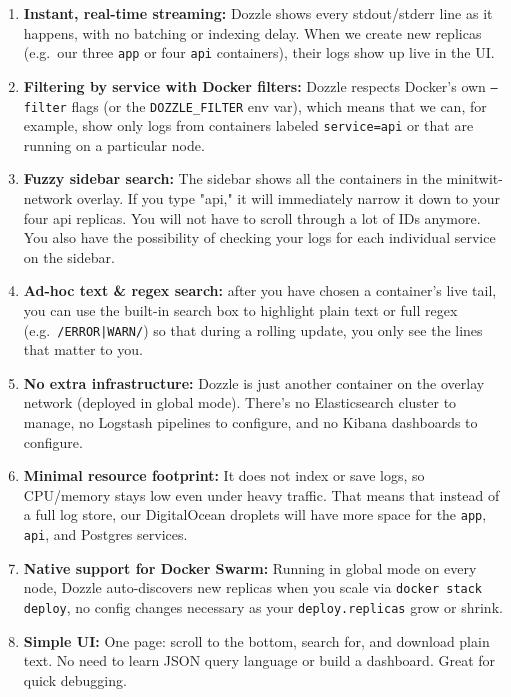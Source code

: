 \begin{enumerate}

  \item \textbf{Instant, real-time streaming:} Dozzle shows every stdout/stderr line as it happens, with no batching or indexing delay. When we create new replicas (e.g.\ our three \texttt{app} or four \texttt{api} containers), their logs show up live in the UI.
  
  \item \textbf{Filtering by service with Docker filters:} Dozzle respects Docker’s own \texttt{--filter} flags (or the \texttt{DOZZLE\_FILTER} env var), which means that we can, for example, show only logs from containers labeled \texttt{service=api} or that are running on a particular node.
  
  \item \textbf{Fuzzy sidebar search:}  The sidebar shows all the containers in the minitwit-network overlay. If you type "api," it will immediately narrow it down to your four api replicas. You will not have to scroll through a lot of IDs anymore. You also have the possibility of checking your logs for each individual service on the sidebar.

  \item \textbf{Ad-hoc text \& regex search:} after you have chosen a container’s live tail, you can use the built-in search box to highlight plain text or full regex (e.g.\ \texttt{/ERROR|WARN/}) so that during a rolling update, you only see the lines that matter to you.
  
  \item \textbf{No extra infrastructure:} Dozzle is just another container on the overlay network (deployed in global mode). There’s no Elasticsearch cluster to manage, no Logstash pipelines to configure, and no Kibana dashboards to configure.
  
  \item \textbf{Minimal resource footprint:} It does not index or save logs, so CPU/memory stays low even under heavy traffic. That means that instead of a full log store, our DigitalOcean droplets will have more space for the \texttt{app}, \texttt{api}, and Postgres services. 
  
  \item \textbf{Native support for Docker Swarm:} Running in global mode on every node, Dozzle auto-discovers new replicas when you scale via \texttt{docker stack deploy}, no config changes necessary as your \texttt{deploy.replicas} grow or shrink.
  
  \item \textbf{Simple UI:} One page: scroll to the bottom, search for, and download plain text. No need to learn JSON query language or build a dashboard. Great for quick debugging.
\end{enumerate}

